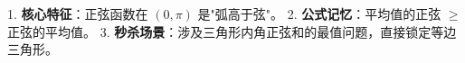 \begin{summarybox}
1. \textbf{核心特征}：正弦函数在 $(0, \pi)$ 是"弧高于弦"。
2. \textbf{公式记忆}：平均值的正弦 $\geqslant$ 正弦的平均值。
3. \textbf{秒杀场景}：涉及三角形内角正弦和的最值问题，直接锁定等边三角形。
\end{summarybox}